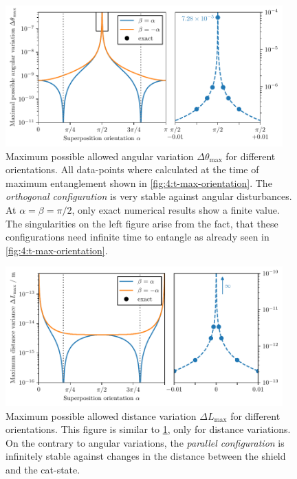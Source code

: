 \begin{figure}[!htbp]
  \centering
  \includegraphics[width=0.95\textwidth]{./../figures/theta-variance/theta-max-orientation-complete.pdf}
  \caption{Maximum possible allowed angular variation $\Delta\theta_\mathrm{max}$ for different orientations. All data-points where calculated at the time of maximum entanglement shown in \cref{fig:4:t-max-orientation}. The \emph{orthogonal configuration} is very stable against angular disturbances. At $\alpha=\beta=\pi/2$, only exact numerical results show a finite value. The singularities on the left figure arise from the fact, that these configurations need infinite time to entangle as already seen in \cref{fig:4:t-max-orientation}.}
  \label{fig:4:theta-max-orientation}
\end{figure}

\begin{figure}[!htbp]
  \centering
  \includegraphics[width=0.95\textwidth]{./../figures/L-variance/L-max-orientation-complete.pdf}
  \caption{Maximum possible allowed distance variation $\Delta L_\mathrm{max}$ for different orientations. This figure is similar to \cref{fig:4:theta-max-orientation}, only for distance variations. On the contrary to angular variations, the \emph{parallel configuration} is infinitely stable against changes in the distance between the shield and the cat-state.}
  \label{fig:4:L-max-orientation}
\end{figure}



